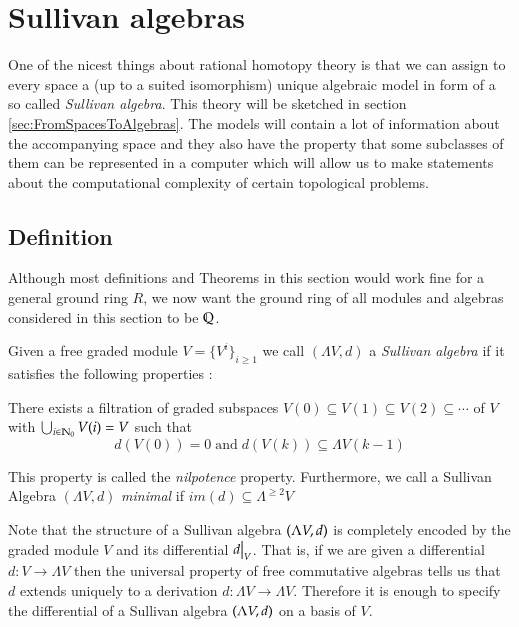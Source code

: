 \section{Sullivan algebras}

One of the nicest things about rational homotopy theory is that we can assign to every space a (up to a
suited isomorphism) unique algebraic model in form of a so called \emph{Sullivan algebra}. This theory
will be sketched in section \ref{sec:FromSpacesToAlgebras}. The models will contain a lot of information
about the accompanying space and they also have the property that some subclasses of them can be
represented in a computer which will allow us to make statements about the computational
complexity of certain topological problems.


\subsection{Definition}
Although most definitions and Theorems in this section would work fine for a general ground ring $R$, we now want the
ground ring of all modules and algebras considered in this section to be $\mathbb{Q}$.

\begin{Definition}
 Given a free graded module $V = {\lbrace {V^i}\rbrace}_{ i \geq 1} $ we call $(\Lambda V, d)$ a \emph{Sullivan algebra} 
 if it satisfies the following properties :
 
  There exists a filtration of graded subspaces $V(0) \subseteq V(1) \subseteq V(2) \subseteq \cdots $ of $V$
  with $\bigcup_{i \in \mathbb{N}_0} V(i) = V$ such that 
  $$ d(V(0)) = 0 \; \text{and} \; d( V(k)) \subseteq  \Lambda V(k-1) $$
  
 This property is called the \emph{nilpotence} property.
 Furthermore, we call a Sullivan Algebra $(\Lambda V,d)$ \emph{minimal} if $im(d) \subseteq \Lambda^{\geq 2} V$
\end{Definition}

Note that the structure of a Sullivan algebra $(\Lambda V,d)$ is completely encoded by the graded module $V$ and its
differential $\restr{d}{V}$. That is, if we are given a differential $d \colon V \to \Lambda V$ then the
universal property of free commutative algebras tells us that $d$ extends uniquely to a derivation $d \colon \Lambda V \to \Lambda V$.
Therefore it is enough to specify the differential of a Sullivan algebra $(\Lambda V,d)$ on a basis of $V$.


